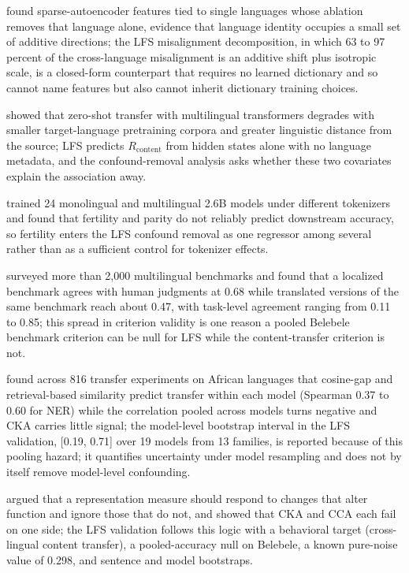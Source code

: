 \documentclass{article} %
\begin{document}
\citet{deng2025unveiling} found sparse-autoencoder features tied to single languages whose ablation removes that language alone, evidence that language identity occupies a small set of additive directions; the LFS misalignment decomposition, in which 63 to 97 percent of the cross-language misalignment is an additive shift plus isotropic scale, is a closed-form counterpart that requires no learned dictionary and so cannot name features but also cannot inherit dictionary training choices.

\citet{lauscher2020hero} showed that zero-shot transfer with multilingual transformers degrades with smaller target-language pretraining corpora and greater linguistic distance from the source; LFS predicts $R_{\mathrm{content}}$ from hidden states alone with no language metadata, and the confound-removal analysis asks whether these two covariates explain the association away.

\citet{ali2024tokenizer} trained 24 monolingual and multilingual 2.6B models under different tokenizers and found that fertility and parity do not reliably predict downstream accuracy, so fertility enters the LFS confound removal as one regressor among several rather than as a sufficient control for tokenizer effects.

\citet{wu2025bitter} surveyed more than 2,000 multilingual benchmarks and found that a localized benchmark agrees with human judgments at 0.68 while translated versions of the same benchmark reach about 0.47, with task-level agreement ranging from 0.11 to 0.85; this spread in criterion validity is one reason a pooled Belebele benchmark criterion can be null for LFS while the content-transfer criterion is not.

\citet{idris2026embedding} found across 816 transfer experiments on African languages that cosine-gap and retrieval-based similarity predict transfer within each model (Spearman 0.37 to 0.60 for NER) while the correlation pooled across models turns negative and CKA carries little signal; the model-level bootstrap interval in the LFS validation, [0.19, 0.71] over 19 models from 13 families, is reported because of this pooling hazard; it quantifies uncertainty under model resampling and does not by itself remove model-level confounding.

\citet{ding2021grounding} argued that a representation measure should respond to changes that alter function and ignore those that do not, and showed that CKA and CCA each fail on one side; the LFS validation follows this logic with a behavioral target (cross-lingual content transfer), a pooled-accuracy null on Belebele, a known pure-noise value of 0.298, and sentence and model bootstraps.
\end{document}
